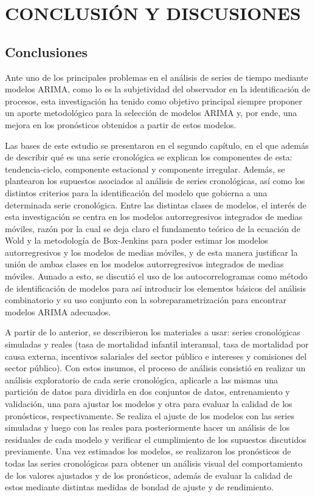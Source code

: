 \documentclass[
]{article}
\begin{document}
\newpage
\newpage

\section{CONCLUSIÓN Y DISCUSIONES}


\label{chap:conclusiones}
\subsection{Conclusiones}

Ante uno de los principales problemas en el análisis de series de tiempo
mediante modelos ARIMA, como lo es la subjetividad del observador en la
identificación de procesos, esta investigación ha tenido como objetivo
principal siempre proponer un aporte metodológico para la selección de
modelos ARIMA y, por ende, una mejora en los pronósticos obtenidos a
partir de estos modelos.

Las bases de este estudio se presentaron en el segundo capítulo, en el
que además de describir qué es una serie cronológica se explican los
componentes de esta: tendencia-ciclo, componente estacional y componente
irregular. Además, se plantearon los supuestos asociados al análisis de
series cronológicas, así como los distintos criterios para la
identificación del modelo que gobierna a una determinada serie
cronológica. Entre las distintas clases de modelos, el interés de esta
investigación se centra en los modelos autorregresivos integrados de
medias móviles, razón por la cual se deja claro el fundamento teórico de
la ecuación de Wold y la metodología de Box-Jenkins para poder estimar
los modelos autorregresivos y los modelos de medias móviles, y de esta
manera justificar la unión de ambas clases en los modelos
autorregresivos integrados de medias móviles. Aunado a esto, se discutió
el uso de los autocorrelogramas como método de identificación de modelos
para así introducir los elementos básicos del análisis combinatorio y su
uso conjunto con la sobreparametrización para encontrar modelos ARIMA
adecuados.

A partir de lo anterior, se describieron los materiales a usar: series
cronológicas simuladas y reales (tasa de mortalidad infantil interanual,
tasa de mortalidad por causa externa, incentivos salariales del sector
público e intereses y comisiones del sector público). Con estos insumos,
el proceso de análisis consistió en realizar un análisis exploratorio de
cada serie cronológica, aplicarle a las mismas una partición de datos
para dividirla en dos conjuntos de datos, entrenamiento y validación,
una para ajustar los modelos y otra para evaluar la calidad de los
pronósticos, respectivamente. Se realiza el ajuste de los modelos con
las series simuladas y luego con las reales para posteriormente hacer un
análisis de los residuales de cada modelo y verificar el cumplimiento de
los supuestos discutidos previamente. Una vez estimados los modelos, se
realizaron los pronósticos de todas las series cronológicas para obtener
un análisis visual del comportamiento de los valores ajustados y de los
pronósticos, además de evaluar la calidad de estos mediante distintas
medidas de bondad de ajuste y de rendimiento.
\end{document}
